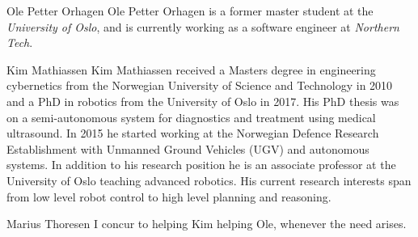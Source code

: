 \documentclass[journal,
transmag,
hidelinks]{IEEEtran}
\newcommand{\0}{\mathbf{0}}
\newcommand{\1}{\mathbf{1}}
\begin{document}
\begin{IEEEbiography}{Ole
  Petter Orhagen}
Ole Petter Orhagen is a former master student at the \textit{University of Oslo}, and is
currently working as a software engineer at \textit{Northern Tech}.
\end{IEEEbiography}

\begin{IEEEbiographynophoto}{Kim Mathiassen}
Kim Mathiassen received a Masters degree in engineering cybernetics from the Norwegian University of Science and Technology in 2010 and a PhD in robotics from the University of Oslo in 2017. His PhD thesis was on a semi-autonomous system for diagnostics and treatment using medical ultrasound.
In 2015 he started working at the Norwegian Defence Research Establishment with Unmanned Ground Vehicles (UGV) and autonomous systems. In addition to his research position he is an associate professor at the University of Oslo teaching advanced robotics. His current research interests span from low level robot control to high level planning and reasoning.
\end{IEEEbiographynophoto}


\begin{IEEEbiographynophoto}{Marius Thoresen}
  I concur to helping Kim helping Ole, whenever the need arises.
\end{IEEEbiographynophoto}






\end{document}
